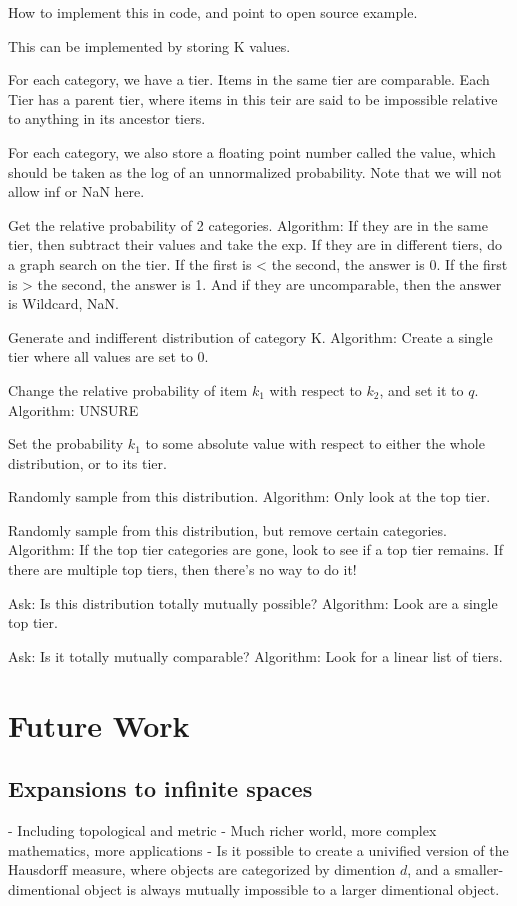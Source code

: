 \documentclass[twoside]{article}
\begin{document}
How to implement this in code, and point to open source example.

This can be implemented by storing K values.

For each category, we have a tier. Items in the same tier are comparable. Each Tier has a parent tier, where items in this teir are said to be impossible relative to anything in its ancestor tiers.

For each category, we also store a floating point number called the value, which should be taken as the log of an unnormalized probability. Note that we will not allow inf or NaN here.

Get the relative probability of 2 categories. Algorithm: If they are in the same tier, then subtract their values and take the exp. If they are in different tiers, do a graph search on the tier. If the first is < the second, the answer is 0. If the first is > the second, the answer is 1. And if they are uncomparable, then the answer is Wildcard, NaN.

Generate and indifferent distribution of category K. Algorithm: Create a single tier where all values are set to 0.

Change the relative probability of item \(k_1\) with respect to \(k_2\), and set it to \(q\). Algorithm: UNSURE

Set the probability \(k_1\) to some absolute value with respect to either the whole distribution, or to its tier.

Randomly sample from this distribution. Algorithm: Only look at the top tier.

Randomly sample from this distribution, but remove certain categories. Algorithm: If the top tier categories are gone, look to see if a top tier remains. If there are multiple top tiers, then there's no way to do it!

Ask: Is this distribution totally mutually possible? Algorithm: Look are a single top tier.

Ask: Is it totally mutually comparable? Algorithm: Look for a linear list of tiers.

\section{Future Work}
\subsection{Expansions to infinite spaces}
- Including topological and metric
- Much richer world, more complex mathematics, more applications
- Is it possible to create a univified version of the Hausdorff measure, where objects are categorized by dimention \(d\), and a smaller-dimentional object is always mutually impossible to a larger dimentional object.
\end{document}
